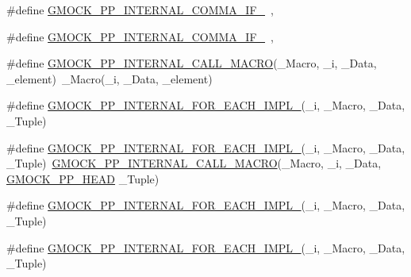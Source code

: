 \begin{DoxyCompactItemize}
\item 
\#define \mbox{\hyperlink{googletest-master_2googlemock_2include_2gmock_2internal_2gmock-pp_8h_a1b3568514e11317780d63491765df95b}{G\+M\+O\+C\+K\+\_\+\+P\+P\+\_\+\+I\+N\+T\+E\+R\+N\+A\+L\+\_\+\+C\+O\+M\+M\+A\+\_\+\+I\+F\+\_}}~,
\item 
\#define \mbox{\hyperlink{googletest-master_2googlemock_2include_2gmock_2internal_2gmock-pp_8h_ab768aec3f52e0f8c5825a45ad83d8836}{G\+M\+O\+C\+K\+\_\+\+P\+P\+\_\+\+I\+N\+T\+E\+R\+N\+A\+L\+\_\+\+C\+O\+M\+M\+A\+\_\+\+I\+F\+\_}}~,
\item 
\#define \mbox{\hyperlink{googletest-master_2googlemock_2include_2gmock_2internal_2gmock-pp_8h_a3fe0cf255d103cc945cd91e0e953846f}{G\+M\+O\+C\+K\+\_\+\+P\+P\+\_\+\+I\+N\+T\+E\+R\+N\+A\+L\+\_\+\+C\+A\+L\+L\+\_\+\+M\+A\+C\+RO}}(\+\_\+\+Macro,  \+\_\+i,  \+\_\+\+Data,  \+\_\+element)~\+\_\+\+Macro(\+\_\+i, \+\_\+\+Data, \+\_\+element)
\item 
\#define \mbox{\hyperlink{googletest-master_2googlemock_2include_2gmock_2internal_2gmock-pp_8h_afa4ea4d70383d332e2d2367b077ce31a}{G\+M\+O\+C\+K\+\_\+\+P\+P\+\_\+\+I\+N\+T\+E\+R\+N\+A\+L\+\_\+\+F\+O\+R\+\_\+\+E\+A\+C\+H\+\_\+\+I\+M\+P\+L\+\_}}(\+\_\+i,  \+\_\+\+Macro,  \+\_\+\+Data,  \+\_\+\+Tuple)
\item 
\#define \mbox{\hyperlink{googletest-master_2googlemock_2include_2gmock_2internal_2gmock-pp_8h_a6dde0a6b2371de18b44f8671b8d0dc22}{G\+M\+O\+C\+K\+\_\+\+P\+P\+\_\+\+I\+N\+T\+E\+R\+N\+A\+L\+\_\+\+F\+O\+R\+\_\+\+E\+A\+C\+H\+\_\+\+I\+M\+P\+L\+\_}}(\+\_\+i,  \+\_\+\+Macro,  \+\_\+\+Data,  \+\_\+\+Tuple)~\mbox{\hyperlink{_obj__test_2lib_2googletest-master_2googlemock_2include_2gmock_2internal_2gmock-pp_8h_a3fe0cf255d103cc945cd91e0e953846f}{G\+M\+O\+C\+K\+\_\+\+P\+P\+\_\+\+I\+N\+T\+E\+R\+N\+A\+L\+\_\+\+C\+A\+L\+L\+\_\+\+M\+A\+C\+RO}}(\+\_\+\+Macro, \+\_\+i, \+\_\+\+Data, \mbox{\hyperlink{_obj__test_2lib_2googletest-master_2googlemock_2include_2gmock_2internal_2gmock-pp_8h_ad7910160dfc0fb20b239efcf1f3ddd85}{G\+M\+O\+C\+K\+\_\+\+P\+P\+\_\+\+H\+E\+AD}} \+\_\+\+Tuple)
\item 
\#define \mbox{\hyperlink{googletest-master_2googlemock_2include_2gmock_2internal_2gmock-pp_8h_ad8277a9a0a83d35b403223078486756e}{G\+M\+O\+C\+K\+\_\+\+P\+P\+\_\+\+I\+N\+T\+E\+R\+N\+A\+L\+\_\+\+F\+O\+R\+\_\+\+E\+A\+C\+H\+\_\+\+I\+M\+P\+L\+\_}}(\+\_\+i,  \+\_\+\+Macro,  \+\_\+\+Data,  \+\_\+\+Tuple)
\item 
\#define \mbox{\hyperlink{googletest-master_2googlemock_2include_2gmock_2internal_2gmock-pp_8h_a2ae498910fad6a0796cdc24e7436c1af}{G\+M\+O\+C\+K\+\_\+\+P\+P\+\_\+\+I\+N\+T\+E\+R\+N\+A\+L\+\_\+\+F\+O\+R\+\_\+\+E\+A\+C\+H\+\_\+\+I\+M\+P\+L\+\_}}(\+\_\+i,  \+\_\+\+Macro,  \+\_\+\+Data,  \+\_\+\+Tuple)

\end{DoxyCompactItemize}
